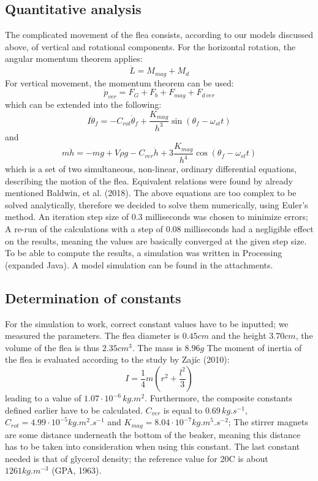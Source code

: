 \documentclass[10pt,a4paper]{article}
\begin{document}
\subsection{Quantitative analysis}
The complicated movement of the flea consists, according to our models discussed above, of vertical and rotational components. For the horizontal rotation, the angular momentum theorem applies:
\begin{equation}
 \dot{L} = M_{mag} + M_d 
 \label{momenthybnosti}
\end{equation}
For vertical movement, the momentum theorem can be used:
\begin{equation}
 \dot{p}_{ver} = F_{G} + F_{b} + F_{mag} + F_{d \, ver} 
 \label{hybnost}
 \end{equation}
which can be extended into the following:
\begin{equation}
 I \ddot{\theta}_f = - C_{rot} \dot{\theta}_{f} + \frac {K_{mag}}{h^3} \sin(\theta_f - \omega_{st} t) 
 \label{rotace}
 \end{equation}
and
\begin{equation}
 m \ddot{h} = -m g + V \rho g - C_{ver} \dot{h} + 3 \frac{K_{mag}}{h^4} \cos(\theta_f - \omega_{st} t) 
 \label{svislypohyb}
 \end{equation}
which is a set of two simultaneous, non-linear, ordinary differential equations, describing the motion of the flea. Equivalent relations were found by already mentioned Baldwin, et al. (2018). The above equations are too complex to be solved analytically, therefore we decided to solve them numerically, using Euler's method. An iteration step size of  0.3 milliseconds was chosen to minimize errors; A re-run of the calculations with a step of 0.08 milliseconds had a negligible effect on the results, meaning the values are basically converged at the given step size. To be able to compute the results, a simulation was written in Processing (expanded Java). A model simulation can be found in the attachments.

\subsection{Determination of constants}
For the simulation to work, correct constant values have to be inputted; we measured the parameters. The flea diameter is $0.45 cm$ and the height $3.70 cm$, the volume of the flea is thus $2.35 cm^3$. The mass is $8.96 g$ The moment of inertia of the flea is evaluated according to the study by Zajíc (2010):
\begin{equation}
 I = \frac{1}{4} m \left( r^2 + \frac{l^2}{3} \right) 
 \label{momentsetrvacnosti}
 \end{equation}
leading to a value of $ 1.07 \cdot 10^{-6} \, kg.m^2 $. Furthermore, the composite constants defined earlier have to be calculated. $C_{ver}$ is equal to $0.69 \, kg.s^{-1}$, $C_{rot} = 4.99 \cdot 10^{-5} kg.m^2.s^{-1}$ and $K_{mag} = 8.04 \cdot 10^{-7} kg.m^5.s^{-2}$; The stirrer magnets are some distance underneath the bottom of the beaker, meaning this distance has to be taken into consideration when using this constant. The last constant needed is that of glycerol density; the reference value for 20\degree C is about $1261 kg.m^{-3}$ (GPA, 1963).
\end{document}
